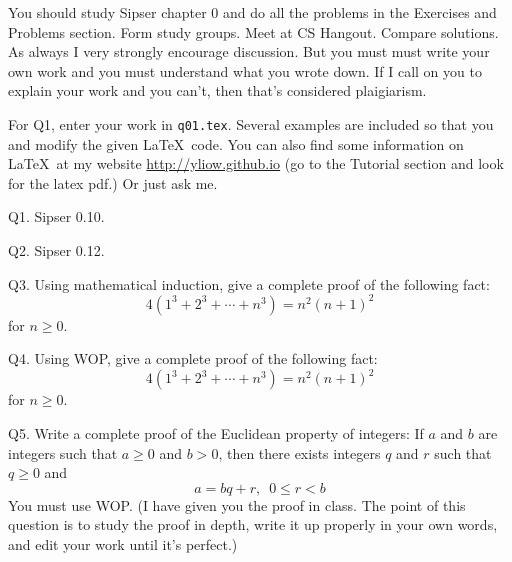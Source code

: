 



\renewcommand\AUTHOR{John Doe}
\renewcommand\EMAIL{jdoe@cougars.ccis.edu}
\renewcommand\TITLE{Assignment 2}


\topmatter

You should study Sipser chapter 0 and do all the problems in the Exercises
and Problems section.
Form study groups. Meet at CS Hangout. Compare solutions.
As always I very strongly encourage discussion.
But you must must write your own work and you must understand what you wrote
down.
If I call on you to explain your work and you can't, then that's considered
plaigiarism.

For Q1, enter your work in \verb!q01.tex!.
Several examples are included so that you and modify the given \LaTeX\ code.
You can also find some information on \LaTeX\ at my website
\url{http://yliow.github.io} (go to the Tutorial section and look for
the latex pdf.) Or just ask me.

\newpage


\newpage
Q1. Sipser 0.10. 

\SOLUTION



\newpage
Q2. Sipser 0.12.

\SOLUTION



\newpage
Q3.
Using mathematical induction, give a complete proof of the following fact:
\[
  4(1^3 + 2^3 + \cdots + n^3) = n^2(n+1)^2
\]
for $n \geq 0$.

\SOLUTION



\newpage
Q4.
Using WOP, give a complete proof of the following fact:
\[
  4(1^3 + 2^3 + \cdots + n^3) = n^2(n+1)^2
\]
for $n \geq 0$.


\SOLUTION



\newpage
Q5. Write a complete proof of the Euclidean property of integers:
If $a$ and $b$ are integers such that $a \geq 0$ and $b > 0$,
then there exists integers $q$ and $r$ such that $q \geq 0$ and
\[
a = bq + r, \,\,\, 0 \leq r < b
\]
You must use WOP.
(I have given you the proof in class.
The point of this question is to study the proof in depth, write it up
properly in your own words, and edit your work until it's perfect.) 


